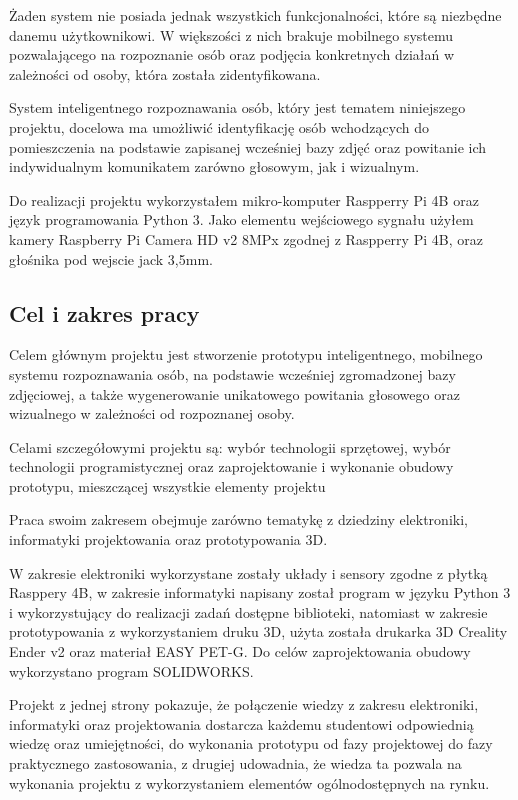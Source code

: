 \documentclass[a4paper,12pt,reqno]{article}
\begin{document}
Żaden system nie posiada jednak wszystkich funkcjonalności, które są niezbędne danemu użytkownikowi. W większości z nich brakuje mobilnego systemu pozwalającego na rozpoznanie osób oraz podjęcia konkretnych działań w zależności od osoby, która została zidentyfikowana.

System inteligentnego rozpoznawania osób, który jest tematem niniejszego projektu, docelowa ma umożliwić identyfikację osób wchodzących do pomieszczenia na podstawie zapisanej wcześniej bazy zdjęć oraz powitanie ich indywidualnym komunikatem zarówno głosowym, jak i wizualnym.

Do realizacji projektu wykorzystałem mikro-komputer Raspperry Pi 4B oraz język programowania Python 3. Jako elementu wejściowego sygnału użyłem kamery Raspberry Pi Camera HD v2 8MPx zgodnej z Raspperry Pi 4B, oraz głośnika pod wejscie jack 3,5mm.

\subsection{Cel i zakres pracy}

Celem głównym projektu jest stworzenie prototypu inteligentnego, mobilnego systemu rozpoznawania osób, na podstawie wcześniej zgromadzonej bazy zdjęciowej, a także wygenerowanie unikatowego powitania głosowego oraz wizualnego w zależności od rozpoznanej osoby.

Celami szczegółowymi projektu są: wybór technologii sprzętowej, wybór technologii programistycznej oraz zaprojektowanie i wykonanie obudowy prototypu, mieszczącej wszystkie elementy projektu

Praca swoim zakresem obejmuje zarówno tematykę z dziedziny elektroniki, informatyki projektowania oraz prototypowania 3D.

W zakresie elektroniki wykorzystane zostały układy i sensory zgodne z płytką Rasppery 4B, w zakresie informatyki napisany został program w języku Python 3 i wykorzystujący do realizacji zadań dostępne biblioteki, natomiast w zakresie prototypowania z wykorzystaniem druku 3D, użyta została drukarka 3D Creality Ender v2 oraz materiał EASY PET-G. Do celów zaprojektowania obudowy wykorzystano program SOLIDWORKS.

Projekt z jednej strony pokazuje, że połączenie wiedzy z zakresu elektroniki, informatyki oraz projektowania dostarcza każdemu studentowi odpowiednią wiedzę oraz umiejętności, do wykonania prototypu od fazy projektowej do fazy praktycznego zastosowania,  z drugiej udowadnia, że wiedza ta pozwala na wykonania projektu z wykorzystaniem elementów ogólnodostępnych na rynku.
\end{document}

